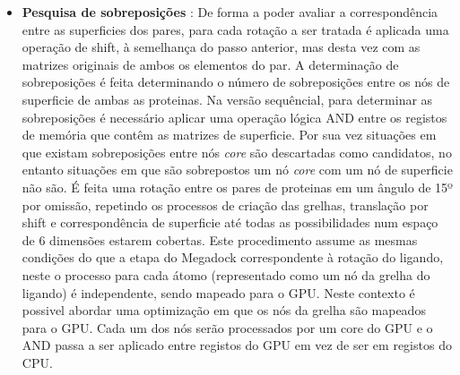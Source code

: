 \begin{itemize}
\item{\textbf{Pesquisa de sobreposições}} : De forma a poder avaliar a correspondência entre as superficies dos pares, para cada rotação a ser tratada é aplicada uma operação de shift, à semelhança do passo anterior, mas desta vez com as matrizes originais de ambos os elementos do par. A determinação de sobreposições é feita determinando o número de sobreposições entre os nós de superficie de ambas as proteinas. Na versão sequêncial, para determinar as sobreposições é necessário aplicar uma operação lógica AND entre os registos de memória que contêm as matrizes de superficie. Por sua vez situações em que existam sobreposições entre nós \textit{core} são descartadas como candidatos, no entanto situações em que são sobrepostos um nó \textit{core} com um nó de superficie não são. É feita uma rotação entre os pares de proteinas em um ângulo de 15º por omissão, repetindo os processos de criação das grelhas, translação por shift e correspondência de superficie até todas as possibilidades num espaço de 6 dimensões estarem cobertas. Este procedimento assume as mesmas condições do que a etapa do Megadock correspondente à rotação do ligando, neste o processo para cada átomo (representado como um nó da grelha do ligando) é independente, sendo mapeado para o GPU. Neste contexto é possivel abordar uma optimização em que os nós da grelha são mapeados para o GPU. Cada um dos nós serão processados por um core do GPU e o AND passa a ser aplicado entre registos do GPU em vez de ser em registos do CPU.

\end{itemize}
